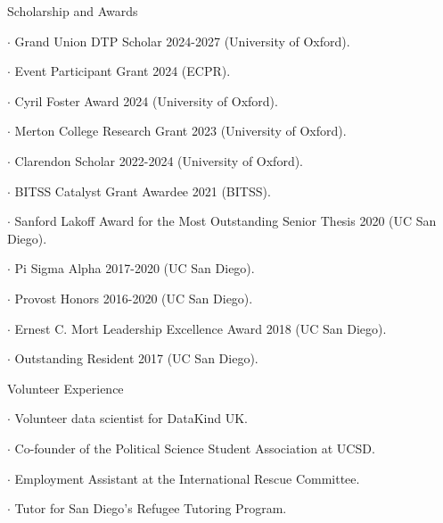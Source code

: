 \documentclass[10pt]{resume} %
\begin{document}
	\begin{rSection}{Scholarship and Awards}
		\itemsep -5pt
		\item $\cdot$ Grand Union DTP Scholar 2024-2027 (University of Oxford).
		\item $\cdot$ Event Participant Grant 2024 (ECPR).
		\item $\cdot$ Cyril Foster Award 2024 (University of Oxford).
		\item $\cdot$ Merton College Research Grant 2023 (University of Oxford).
		\item $\cdot$ Clarendon Scholar 2022-2024 (University of Oxford).
		\item $\cdot$ BITSS Catalyst Grant Awardee 2021 (BITSS).
		\item $\cdot$ Sanford Lakoff Award for the Most Outstanding Senior Thesis 2020 (UC San Diego).
		\item $\cdot$ Pi Sigma Alpha 2017-2020 (UC San Diego). 
		\item $\cdot$ Provost Honors 2016-2020 (UC San Diego). 
		\item $\cdot$ Ernest C. Mort Leadership Excellence Award 2018 (UC San Diego). 
		\item $\cdot$ Outstanding Resident 2017 (UC San Diego).
	\end{rSection}
	
	\begin{rSection}{Volunteer Experience} \itemsep -5pt
		\item $\cdot$ Volunteer data scientist for DataKind UK.
		\item $\cdot$ Co-founder of the Political Science Student Association at UCSD.
		\item $\cdot$ Employment Assistant at the International Rescue Committee.
		\item $\cdot$ Tutor for San Diego's Refugee Tutoring Program.
	\end{rSection}
\end{document}
